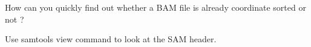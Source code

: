\begin{questions}
How can you quickly find out whether a BAM file is already coordinate sorted or not ? 
\begin{answer}
Use samtools view command to look at the SAM header.
\end{answer}
\end{questions}



